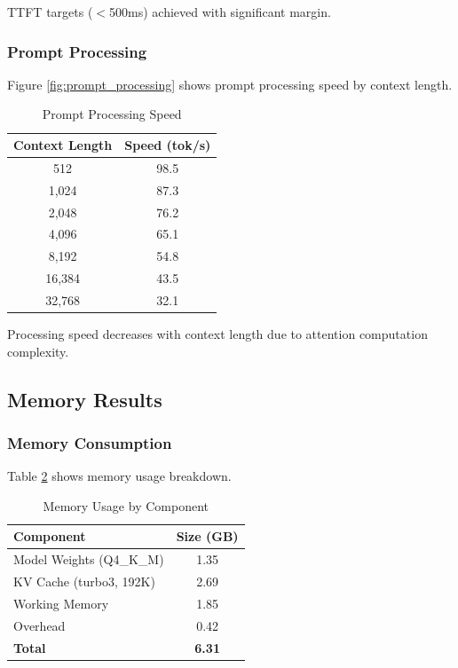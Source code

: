TTFT targets ($<$500ms) achieved with significant margin.

\subsubsection{Prompt Processing}

Figure \ref{fig:prompt_processing} shows prompt processing speed by context length.

\begin{table}[h]
\centering
\caption{Prompt Processing Speed}
\label{tab:prompt_processing}
\begin{tabular}{cc}
\toprule
\textbf{Context Length} & \textbf{Speed (tok/s)} \\
\midrule
512 & 98.5 \\
1,024 & 87.3 \\
2,048 & 76.2 \\
4,096 & 65.1 \\
8,192 & 54.8 \\
16,384 & 43.5 \\
32,768 & 32.1 \\
\bottomrule
\end{tabular}
\end{table}

Processing speed decreases with context length due to attention computation complexity.

\subsection{Memory Results}

\subsubsection{Memory Consumption}

Table \ref{tab:memory_results} shows memory usage breakdown.

\begin{table}[h]
\centering
\caption{Memory Usage by Component}
\label{tab:memory_results}
\begin{tabular}{lc}
\toprule
\textbf{Component} & \textbf{Size (GB)} \\
\midrule
Model Weights (Q4\_K\_M) & 1.35 \\
KV Cache (turbo3, 192K) & 2.69 \\
Working Memory & 1.85 \\
Overhead & 0.42 \\
\midrule
\textbf{Total} & \textbf{6.31} \\
\bottomrule
\end{tabular}
\end{table}

